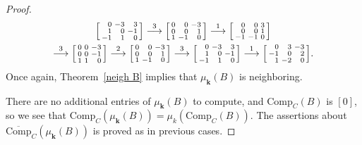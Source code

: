 \documentclass{amsart}
\theoremstyle{definition}
\theoremstyle{remark}
\numberwithin{equation}{section}
\newcommand{\0}{{\mathbf{0}}}
\newcommand{\Comp}{\mathrm{Comp}_C}
\newcommand{\CompPlus}{\overline{\mathrm{Comp}}_C}
\newcommand{\kk}{{\boldsymbol{k}}}
\begin{document}
\begin{proof}
\begin{multline*}
\begin{bsmallmatrix*}[r]
0&-3&3\\
1&0&-1\\
-1&1&0
\end{bsmallmatrix*}
\overset{3}{\longrightarrow}
\begin{bsmallmatrix*}[r]
0&0&-3\\
0&0&1\\
1&-1&0
\end{bsmallmatrix*}
\overset{1}{\longrightarrow}
\begin{bsmallmatrix*}[r]
0&0&3\\
0&0&1\\
-1&-1&0
\end{bsmallmatrix*}\\
\overset{3}{\longrightarrow}
\begin{bsmallmatrix*}[r]
0&0&-3\\
0&0&-1\\
1&1&0
\end{bsmallmatrix*}
\overset{2}{\longrightarrow}
\begin{bsmallmatrix*}[r]
0&0&-3\\
0&0&1\\
1&-1&0
\end{bsmallmatrix*}
\overset{3}{\longrightarrow}
\begin{bsmallmatrix*}[r]
0&-3&3\\
1&0&-1\\
-1&1&0
\end{bsmallmatrix*}
\overset{1}{\longrightarrow}
\begin{bsmallmatrix*}[r]
0&3&-3\\
-1&0&2\\
1&-2&0
\end{bsmallmatrix*}.
\end{multline*}
Once again, Theorem~\ref{neigh B} implies that $\mu_\kk(B)$ is neighboring.

There are no additional entries of $\mu_\kk(B)$ to compute, and $\Comp(B)$ is $[0]$, so we see that $\Comp(\mu_\kk(B))=\mu_k(\Comp(B))$.
The assertions about $\CompPlus(\mu_\kk(B))$ is proved as in previous cases.


\end{proof}
\end{document}
